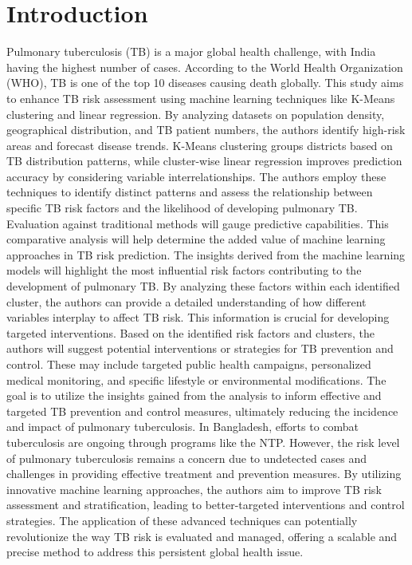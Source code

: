 \documentclass[conference]{IEEEtran}
\begin{document}
\section{Introduction}
Pulmonary tuberculosis (TB) is a major global health challenge, with India having the highest number of cases. According to the World Health Organization (WHO), TB is one of the top 10 diseases causing death globally. This study aims to enhance TB risk assessment using machine learning techniques like K-Means clustering and linear regression. By analyzing datasets on population density, geographical distribution, and TB patient numbers, the authors identify high-risk areas and forecast disease trends. K-Means clustering groups districts based on TB distribution patterns, while cluster-wise linear regression improves prediction accuracy by considering variable interrelationships. The authors employ these techniques to identify distinct patterns and assess the relationship between specific TB risk factors and the likelihood of developing pulmonary TB. Evaluation against traditional methods will gauge predictive capabilities. This comparative analysis will help determine the added value of machine learning approaches in TB risk prediction. The insights derived from the machine learning models will highlight the most influential risk factors contributing to the development of pulmonary TB. By analyzing these factors within each identified cluster, the authors can provide a detailed understanding of how different variables interplay to affect TB risk. This information is crucial for developing targeted interventions. Based on the identified risk factors and clusters, the authors will suggest potential interventions or strategies for TB prevention and control. These may include targeted public health campaigns, personalized medical monitoring, and specific lifestyle or environmental modifications. The goal is to utilize the insights gained from the analysis to inform effective and targeted TB prevention and control measures, ultimately reducing the incidence and impact of pulmonary tuberculosis. In Bangladesh, efforts to combat tuberculosis are ongoing through programs like the NTP. However, the risk level of pulmonary tuberculosis remains a concern due to undetected cases and challenges in providing effective treatment and prevention measures. By utilizing innovative machine learning approaches, the authors aim to improve TB risk assessment and stratification, leading to better-targeted interventions and control strategies. The application of these advanced techniques can potentially revolutionize the way TB risk is evaluated and managed, offering a scalable and precise method to address this persistent global health issue.
\end{document}
